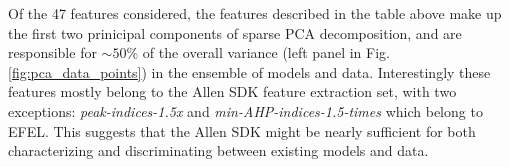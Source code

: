 
  
  



Of the 47 features considered, the features described in the table above make up the first two prinicipal components of sparse PCA decomposition, and are responsible for $\sim 50\%$ of the overall variance (left panel in Fig. \ref{fig:pca_data_points}) in the ensemble of models and data.
Interestingly these features mostly belong to the Allen SDK feature extraction set, with two exceptions: \emph{peak-indices-1.5x}  and \emph{min-AHP-indices-1.5-times} which belong to EFEL.
This suggests that the Allen SDK might be nearly sufficient for both characterizing and discriminating between existing models and data.

